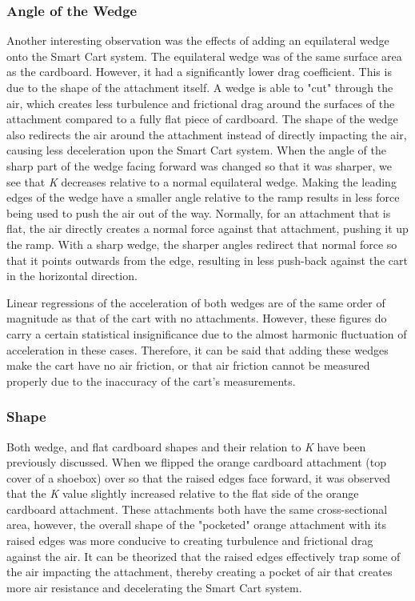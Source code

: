 \subsubsection{Angle of the Wedge}
Another interesting observation was the effects of adding an equilateral wedge onto the Smart Cart system. The equilateral wedge was of the same
surface area as the cardboard. However, it had a significantly lower drag coefficient. This is due to the shape of the
attachment itself. A wedge is able to "cut" through the air, which creates less turbulence and frictional drag around the surfaces
of the attachment compared to a fully flat piece of cardboard. The shape of the wedge also redirects the air around the attachment
instead of directly impacting the air, causing less deceleration upon the Smart Cart system.
When the angle of the sharp part of the wedge facing forward was changed so that it was sharper, we see that \textit{K}
decreases relative to a normal equilateral wedge. Making the leading edges of the wedge have a smaller angle relative
to the ramp results in less force being used to push the air out of the way. Normally, for an attachment that is flat, the air directly
creates a normal force against that attachment, pushing it up the ramp. With a sharp wedge, the sharper angles redirect that normal force
so that it points outwards from the edge, resulting in less push-back against the cart in the horizontal direction.

Linear regressions of the acceleration of both wedges are of the same order of magnitude as that of the cart with no attachments.
However, these figures do carry a certain statistical insignificance due to the almost harmonic fluctuation of acceleration in these cases.
Therefore, it can be said that adding these wedges make the cart have no air friction, or that air friction cannot be measured properly due to the 
inaccuracy of the cart's measurements.

\subsubsection{Shape}
Both wedge, and flat cardboard shapes and their relation to \textit{K} have been previously discussed. When we flipped
the orange cardboard attachment (top cover of a shoebox) over so that the raised edges face forward, it was observed that the
\textit{K} value slightly increased relative to the flat side of the orange cardboard attachment. These attachments both have the
same cross-sectional area, however, the overall shape of the "pocketed" orange attachment with its raised edges was more
conducive to creating turbulence and frictional drag against the air. It can be theorized that the raised edges effectively
trap some of the air impacting the attachment, thereby creating a pocket of air that creates more air resistance and decelerating the Smart Cart system.

